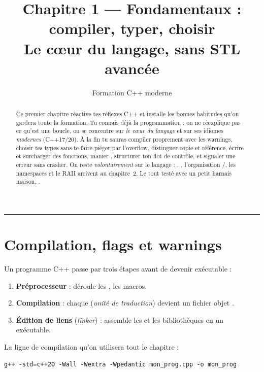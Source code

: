 \documentclass[11pt]{article}
\title{\textbf{Chapitre 1 — Fondamentaux : compiler, typer, choisir}\\[0.3em]
       \large Le cœur du langage, sans STL avancée}
\author{Formation C++ moderne}
\date{}
\begin{document}
\maketitle

\begin{abstract}
\noindent Ce premier chapitre réactive tes réflexes C++ et installe les bonnes
habitudes qu'on gardera toute la formation. Tu connais déjà la programmation :
on ne réexplique pas ce qu'est une boucle, on se concentre sur \emph{le cœur du
langage} et sur ses idiomes \emph{modernes} (C++17/20). À la fin tu sauras
compiler proprement avec les warnings, choisir tes types sans te faire piéger
par l'overflow, distinguer copie et référence, écrire et surcharger des
fonctions, manier , structurer ton flot de contrôle, et signaler
une erreur sans crasher. On reste \emph{volontairement} sur le langage :
, , l'organisation /,
les namespaces et le RAII arrivent au chapitre~2. Le tout testé avec un petit
harnais maison, .
\end{abstract}

\tableofcontents
\bigskip\hrule\bigskip

\section{Compilation, flags et warnings}

Un programme C++ passe par trois étapes avant de devenir exécutable :

\begin{enumerate}[noitemsep]
    \item \textbf{Préprocesseur} : déroule les , les macros.
    \item \textbf{Compilation} : chaque  (\emph{unité de traduction})
          devient un fichier objet .
    \item \textbf{Édition de liens} (\emph{linker}) : assemble les  et
          les bibliothèques en un exécutable.
\end{enumerate}

La ligne de compilation qu'on utilisera tout le chapitre :

\begin{lstlisting}
g++ -std=c++20 -Wall -Wextra -Wpedantic mon_prog.cpp -o mon_prog
\end{lstlisting}
\end{document}
